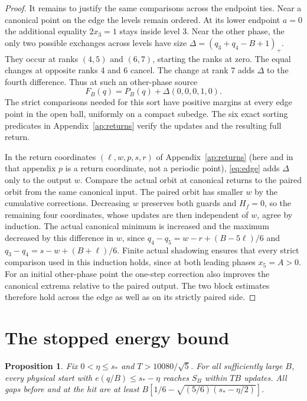 \documentclass[11pt,reqno]{amsart}
\newtheorem{proposition}[theorem]{Proposition}
\theoremstyle{remark}
\begin{document}
\begin{proof}
It remains to justify the same comparisons across the endpoint ties. Near a canonical point on the edge the levels remain ordered. At its lower endpoint \(a=0\) the additional equality \(2x_3=1\) stays inside level 3. Near the other phase, the only two possible exchanges across levels have size \(\Delta=(q_3+q_4-B+1)_+\). They occur at ranks \((4,5)\) and \((6,7)\), starting the ranks at zero. The equal changes at opposite ranks 4 and 6 cancel. The change at rank 7 adds \(\Delta\) to the fourth difference. Thus at such an other-phase source
\begin{equation}\label{eq:edge}
 F_B(q)=P_B(q)+\Delta(0,0,0,1,0).
\end{equation}
The strict comparisons needed for this sort have positive margins at every edge point in the open ball, uniformly on a compact subedge. The six exact sorting predicates in Appendix~\ref{ap:returns} verify the updates and the resulting full return.

In the return coordinates \((\ell,w,p,s,r)\) of Appendix~\ref{ap:returns} (here and in that appendix \(p\) is a return coordinate, not a periodic point), \eqref{eq:edge} adds \(\Delta\) only to the output \(w\). Compare the actual orbit at canonical returns to the paired orbit from the same canonical input. The paired orbit has smaller \(w\) by the cumulative corrections. Decreasing \(w\) preserves both guards and \(H_f=0\), so the remaining four coordinates, whose updates are then independent of \(w\), agree by induction. The actual canonical minimum is increased and the maximum decreased by this difference in \(w\), since \(q_4-q_5=w-r+(B-5\ell)/6\) and \(q_3-q_4=s-w+(B+\ell)/6\). Finite actual shadowing ensures that every strict comparison used in this induction holds, since at both leading phases \(x_5=A>0\). For an initial other-phase point the one-step correction also improves the canonical extrema relative to the paired output. The two block estimates therefore hold across the edge as well as on its strictly paired side.
\end{proof}

\section{The stopped energy bound}\label{sec:stopped}

\begin{proposition}\label{prop:restart}
Fix \(0<\eta\le s_*\) and \(T>10080/\sqrt5\). For all sufficiently large \(B\), every physical start with \(e(q/B)\le s_*-\eta\) reaches \(S_B\) within \(TB\) updates. All gaps before and at the hit are at least \(B[1/6-\sqrt{(5/6)(s_*-\eta/2)}]\).
\end{proposition}
\end{document}
